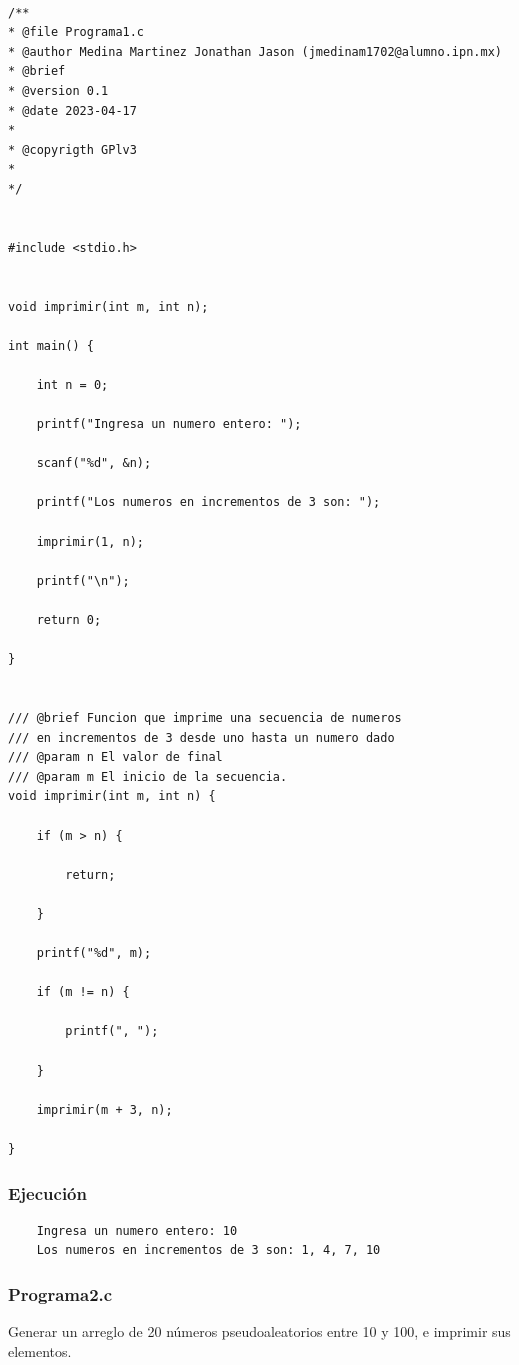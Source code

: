 \documentclass{article}
\begin{document}
	\begin{lstlisting}

/**
* @file Programa1.c
* @author Medina Martinez Jonathan Jason (jmedinam1702@alumno.ipn.mx)
* @brief 
* @version 0.1
* @date 2023-04-17
* 
* @copyrigth GPlv3
* 
*/


#include <stdio.h>


void imprimir(int m, int n);

int main() {

	int n = 0;
	
	printf("Ingresa un numero entero: ");
	
	scanf("%d", &n);
	
	printf("Los numeros en incrementos de 3 son: ");
	
	imprimir(1, n);
	
	printf("\n");
	
	return 0;

}


/// @brief Funcion que imprime una secuencia de numeros 
/// en incrementos de 3 desde uno hasta un numero dado
/// @param n El valor de final
/// @param m El inicio de la secuencia.
void imprimir(int m, int n) {
	
	if (m > n) {

		return;

	}
	
	printf("%d", m);
	
	if (m != n) {

		printf(", ");

	}
	
	imprimir(m + 3, n);

}
	\end{lstlisting}
	
	\subsubsection{Ejecución}
	
	\begin{lstlisting}
	Ingresa un numero entero: 10
	Los numeros en incrementos de 3 son: 1, 4, 7, 10
	\end{lstlisting}
	
	\newpage
	
	\subsubsection{Programa2.c}
	
	Generar un arreglo de 20 números pseudoaleatorios entre 10 y 100, e imprimir sus elementos.
	
\end{document}
